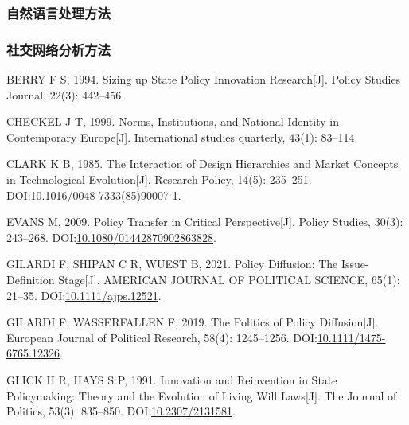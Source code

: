 \documentclass[
  12pt,
]{ctexart}
\newlength{\cslhangindent}
\newlength{\cslentryspacingunit} %
\newenvironment{CSLReferences}[2] %
 {%
  \setlength{\parindent}{0pt}
  \ifodd #1
  \let\oldpar\par
  \def\par{\hangindent=\cslhangindent\oldpar}
  \fi
  \setlength{\parskip}{#2\cslentryspacingunit}
 }%
 {}
\begin{document}
\hypertarget{ux81eaux7136ux8bedux8a00ux5904ux7406ux65b9ux6cd5}{%
\subsubsection{自然语言处理方法}\label{ux81eaux7136ux8bedux8a00ux5904ux7406ux65b9ux6cd5}}

\hypertarget{ux793eux4ea4ux7f51ux7edcux5206ux6790ux65b9ux6cd5}{%
\subsubsection*{社交网络分析方法}\label{ux793eux4ea4ux7f51ux7edcux5206ux6790ux65b9ux6cd5}}

\hypertarget{refs}{}
\begin{CSLReferences}{1}{0}
\leavevmode{}%
BERRY F S, 1994. Sizing up State Policy Innovation Research{[}J{]}. Policy Studies Journal, 22(3): 442--456.

\leavevmode{}%
CHECKEL J T, 1999. Norms, Institutions, and National Identity in Contemporary {Europe}{[}J{]}. International studies quarterly, 43(1): 83--114.

\leavevmode{}%
CLARK K B, 1985. The Interaction of Design Hierarchies and Market Concepts in Technological Evolution{[}J{]}. Research Policy, 14(5): 235--251. DOI:\href{https://doi.org/10.1016/0048-7333(85)90007-1}{10.1016/0048-7333(85)90007-1}.

\leavevmode{}%
EVANS M, 2009. Policy Transfer in Critical Perspective{[}J{]}. Policy Studies, 30(3): 243--268. DOI:\href{https://doi.org/10.1080/01442870902863828}{10.1080/01442870902863828}.

\leavevmode{}%
GILARDI F, SHIPAN C R, WUEST B, 2021. Policy {Diffusion}: {The Issue-Definition Stage}{[}J{]}. AMERICAN JOURNAL OF POLITICAL SCIENCE, 65(1): 21--35. DOI:\href{https://doi.org/10.1111/ajps.12521}{10.1111/ajps.12521}.

\leavevmode{}%
GILARDI F, WASSERFALLEN F, 2019. The Politics of Policy Diffusion{[}J{]}. European Journal of Political Research, 58(4): 1245--1256. DOI:\href{https://doi.org/10.1111/1475-6765.12326}{10.1111/1475-6765.12326}.

\leavevmode{}%
GLICK H R, HAYS S P, 1991. Innovation and {Reinvention} in {State Policymaking}: {Theory} and the {Evolution} of {Living Will Laws}{[}J{]}. The Journal of Politics, 53(3): 835--850. DOI:\href{https://doi.org/10.2307/2131581}{10.2307/2131581}.


\end{CSLReferences}
\end{document}
